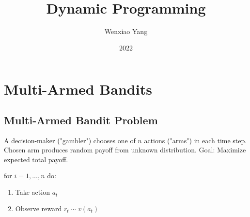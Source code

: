 \documentclass[11pt]{elegantbook}
\title{\textbf{Dynamic Programming}}
\author{Wenxiao Yang}
\institute{Department of Mathematics, University of Illinois at Urbana-Champaign}
\date{2022}
\begin{document}
\maketitle
\frontmatter
\tableofcontents
\mainmatter


\chapter{Multi-Armed Bandits}
\section{Multi-Armed Bandit Problem}
\begin{definition}
    A decision-maker ("gambler") chooses one of $n$ actions ("arms") in each time step. Chosen arm produces random payoff from unknown distribution. Goal: Maximize expected total payoff.

    for $i=1,...,n$ do:
    \begin{enumerate}
        \item Take action $a_t$
        \item Observe reward $r_t\sim v(a_t)$
    \end{enumerate}
\end{definition}
\end{document}
